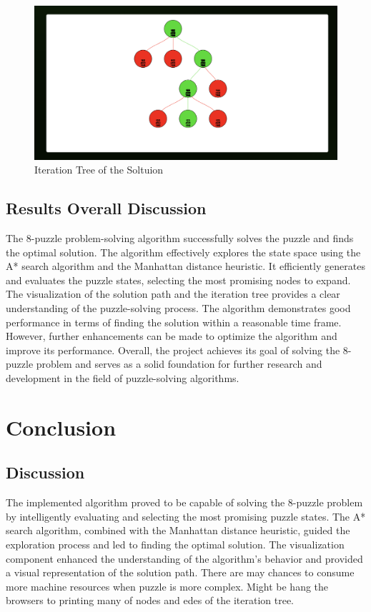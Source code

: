 \documentclass[12pt]{report}
\begin{document}
\begin{figure}[thbp]
    \begin{center}
     \includegraphics[width=1\textwidth]{outputs/iteration-tree.png}
    \end{center}
    \caption{Iteration Tree of the Soltuion}
    \label{fig:iteration-tree}
 \end{figure}

\newpage
\section{Results Overall Discussion}
The 8-puzzle problem-solving algorithm successfully solves the puzzle and finds the optimal solution. The algorithm effectively explores the state space using the A* search algorithm and the Manhattan distance heuristic. It efficiently generates and evaluates the puzzle states, selecting the most promising nodes to expand. The visualization of the solution path and the iteration tree provides a clear understanding of the puzzle-solving process. The algorithm demonstrates good performance in terms of finding the solution within a reasonable time frame. However, further enhancements can be made to optimize the algorithm and improve its performance. Overall, the project achieves its goal of solving the 8-puzzle problem and serves as a solid foundation for further research and development in the field of puzzle-solving algorithms. 





\newpage
\chapter{Conclusion}

\section{Discussion}
The implemented algorithm proved to be capable of solving the 8-puzzle problem by intelligently evaluating and selecting the most promising puzzle states. The A* search algorithm, combined with the Manhattan distance heuristic, guided the exploration process and led to finding the optimal solution. The visualization component enhanced the understanding of the algorithm's behavior and provided a visual representation of the solution path. There are may chances to consume more machine resources when puzzle is more complex. Might be hang the browsers to printing many of nodes and edes of the iteration tree.
\end{document}

